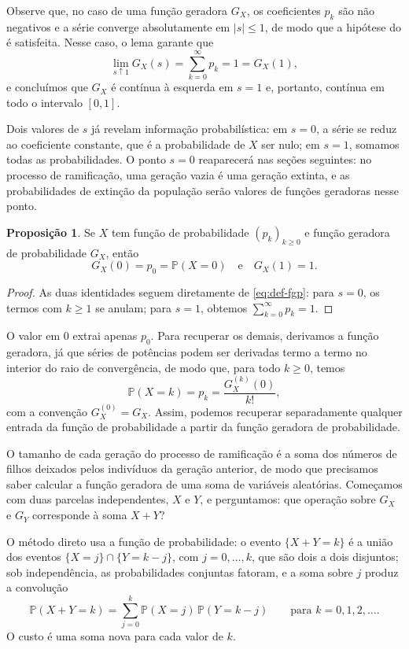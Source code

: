 \documentclass[12pt,portuguese]{article}
\theoremstyle{definition}
\newtheorem{proposition}[proposition]{Proposição}
\theoremstyle{plainexercise}
\theoremstyle{starredexercise}
\theoremstyle{definition}
\begin{document}
Observe que, no caso de uma função geradora $G_X$, os coeficientes $p_k$ são não negativos
e a série converge absolutamente em $|s|\leqslant 1$, de modo que a
hipótese do  é satisfeita. Nesse caso, o lema garante que
\[
\lim_{s\uparrow 1}G_X(s)=\sum_{k=0}^{\infty}p_k=1=G_X(1),
\]
e concluímos que $G_X$ é contínua à esquerda em $s=1$ e, portanto,
contínua em todo o intervalo $[0,1]$.

Dois valores de $s$ já revelam informação probabilística: em $s=0$, a série
se reduz ao coeficiente constante, que é a probabilidade de $X$ ser nulo;
em $s=1$, somamos todas as probabilidades. O ponto $s=0$ reaparecerá nas
seções seguintes: no processo de ramificação, uma geração vazia é uma
geração extinta, e as probabilidades de extinção da população serão
valores de funções geradoras nesse ponto.

\begin{proposition}\label{prop:fgp-basica}
Se $X$ tem função de probabilidade $(p_k)_{k\geqslant 0}$ e 
função geradora de probabilidade $G_X$, então
\[
G_X(0)=p_0=\mathbb{P}(X=0)
\quad\text{e}\quad
G_X(1)=1.
\]
\end{proposition}

\begin{proof}
As duas identidades seguem diretamente de \eqref{eq:def-fgp}: para $s=0$, os
termos com $k\geqslant 1$ se anulam; para $s=1$, obtemos
$\sum_{k=0}^{\infty}p_k=1$.
\end{proof}

O valor em $0$ extrai apenas $p_0$. Para recuperar os demais, derivamos a função geradora, 
já que séries de potências podem ser derivadas
termo a termo no interior do raio de convergência, de modo que, para todo $k\geqslant 0$,
temos
\[
\mathbb{P}(X=k)=p_k=\frac{G_X^{(k)}(0)}{k!},
\]
com a convenção $G_X^{(0)}=G_X$. Assim, podemos recuperar separadamente qualquer
entrada da função de probabilidade a partir da função geradora de probabilidade.

\medskip

O tamanho de cada geração do processo de ramificação é a soma dos números
de filhos deixados pelos indivíduos da geração anterior, de modo que
precisamos saber calcular a função geradora de uma soma de variáveis
aleatórias. Começamos com duas parcelas independentes, $X$ e $Y$, e
perguntamos: que operação sobre $G_X$ e $G_Y$ corresponde à soma $X+Y$?

O método direto usa a função de probabilidade: o evento $\{X+Y=k\}$ é a
união dos eventos $\{X=j\}\cap\{Y=k-j\}$, com $j=0,\ldots,k$, que são
dois a dois disjuntos; sob independência, as probabilidades conjuntas
fatoram, e a soma sobre $j$ produz a convolução
\[
\mathbb{P}(X+Y=k)=\sum_{j=0}^{k}\mathbb{P}(X=j)\,\mathbb{P}(Y=k-j)
\qquad\text{para } k=0,1,2,\ldots.
\]
O custo é uma soma nova para cada valor de $k$.
\end{document}
